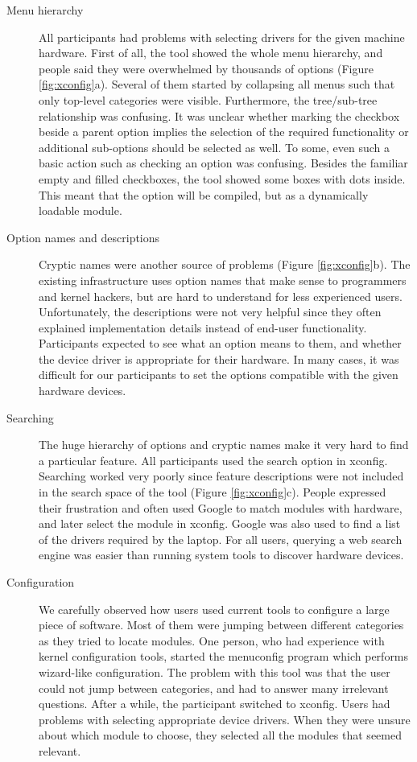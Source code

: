 \documentclass{chi2009}
\begin{document}
\begin{description}
  \item[Menu hierarchy]
All participants had problems with selecting drivers for the given machine hardware. First of all, the tool showed the whole menu hierarchy, and people said
they were overwhelmed by thousands of options (Figure \ref{fig:xconfig}a). Several of them started by collapsing all menus such that only top-level categories
were visible. Furthermore, the tree/sub-tree relationship was confusing. It was unclear whether marking the checkbox beside a parent option implies the
selection of the required functionality or additional sub-options should be selected as well. To some, even such a basic action such as checking an option was
confusing. Besides the familiar empty and filled checkboxes, the tool showed some boxes with dots inside. This meant that the option will be compiled, but as a
dynamically loadable module.

  \item[Option names and descriptions]
Cryptic names were another source of problems (Figure \ref{fig:xconfig}b). The existing infrastructure uses option names that make sense to programmers and
kernel hackers, but are hard to understand for less experienced users. Unfortunately, the descriptions were not very helpful since they often explained
implementation details instead of end-user functionality. Participants expected to see what an option means to them, and whether the device driver is
appropriate for their hardware. In many cases, it was difficult for our participants to set the options compatible with the given hardware devices.

  \item[Searching]
The huge hierarchy of options and cryptic names make it very hard to find a particular feature. All participants used the search option in \textsf{xconfig}.
Searching worked very poorly since feature descriptions were not included in the search space of the tool (Figure \ref{fig:xconfig}c). People expressed their
frustration and often used Google to match modules with hardware, and later select the module in \textsf{xconfig}. Google was also used to find a list of the
drivers required by the laptop. For all users, querying a web search engine was easier than running system tools to discover hardware devices.

  \item[Configuration]
We carefully observed how users used current tools to configure a large piece of software. Most of them were jumping between different categories as they tried
to locate modules. One person, who had experience with kernel configuration tools, started the \textsf{menuconfig} program which performs wizard-like
configuration. The problem with this tool was that the user could not jump between categories, and had to answer many irrelevant questions. After a while, the
participant switched to \textsf{xconfig}. Users had problems with selecting appropriate device drivers. When they were unsure about which module to choose, they
selected all the modules that seemed relevant. 
\end{description}
\end{document}
